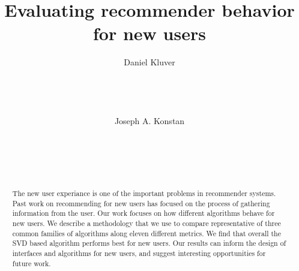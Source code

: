 \documentclass[letterpaper]{sig-alternate}
\begin{document}

\title{Evaluating recommender behavior for new users}


\author {
\alignauthor
Daniel Kluver\\
\\
\\
\\
\\
\alignauthor
Joseph A. Konstan\\
\\
\\
\\
\\
}

\maketitle
\begin{abstract}

  The new user experiance is one of the important problems in recommender systems.
  Past work on recommending for new users has focused on the process of gathering information from the user.
  Our work focuses on how different algorithms behave for new users.
  We describe a methodology that we use to compare representative of three common families of algorithms along eleven different metrics.
  We find that overall the SVD based algorithm performs best for new users.
  Our results can inform the design of interfaces and algorithms for new users, and suggest interesting opportunities for future work.

\end{abstract}


\end{document}
